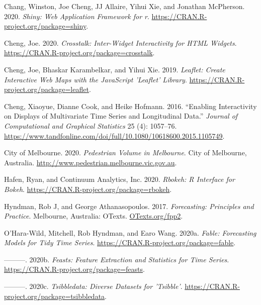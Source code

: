 \hypertarget{refs}{}
\begin{CSLReferences}{1}{0}
\leavevmode{}%
Chang, Winston, Joe Cheng, JJ Allaire, Yihui Xie, and Jonathan McPherson. 2020. \emph{Shiny: Web Application Framework for r}. \url{https://CRAN.R-project.org/package=shiny}.

\leavevmode{}%
Cheng, Joe. 2020. \emph{Crosstalk: Inter-Widget Interactivity for HTML Widgets}. \url{https://CRAN.R-project.org/package=crosstalk}.

\leavevmode{}%
Cheng, Joe, Bhaskar Karambelkar, and Yihui Xie. 2019. \emph{Leaflet: Create Interactive Web Maps with the JavaScript 'Leaflet' Library}. \url{https://CRAN.R-project.org/package=leaflet}.

\leavevmode{}%
Cheng, Xiaoyue, Dianne Cook, and Heike Hofmann. 2016. {``Enabling Interactivity on Displays of Multivariate Time Series and Longitudinal Data.''} \emph{Journal of Computational and Graphical Statistics} 25 (4): 1057--76. \url{https://www.tandfonline.com/doi/full/10.1080/10618600.2015.1105749}.

\leavevmode{}%
City of Melbourne. 2020. \emph{Pedestrian Volume in Melbourne}. City of Melbourne, Australia. \url{http://www.pedestrian.melbourne.vic.gov.au}.

\leavevmode{}%
Hafen, Ryan, and Continuum Analytics, Inc. 2020. \emph{Rbokeh: R Interface for Bokeh}. \url{https://CRAN.R-project.org/package=rbokeh}.

\leavevmode{}%
Hyndman, Rob J, and George Athanasopoulos. 2017. \emph{Forecasting: Principles and Practice}. Melbourne, Australia: OTexts. \href{https://OTexts.org/fpp2}{OTexts.org/fpp2}.

\leavevmode{}%
O'Hara-Wild, Mitchell, Rob Hyndman, and Earo Wang. 2020a. \emph{Fable: Forecasting Models for Tidy Time Series}. \url{https://CRAN.R-project.org/package=fable}.

\leavevmode{}%
---------. 2020b. \emph{Feasts: Feature Extraction and Statistics for Time Series}. \url{https://CRAN.R-project.org/package=feasts}.

\leavevmode{}%
---------. 2020c. \emph{Tsibbledata: Diverse Datasets for 'Tsibble'}. \url{https://CRAN.R-project.org/package=tsibbledata}.


\end{CSLReferences}
